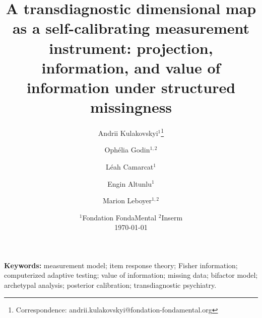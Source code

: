 \documentclass[11pt]{article}
\title{\bfseries A transdiagnostic dimensional map as a self-calibrating
measurement instrument: projection, information, and value of information
under structured missingness}
\author{%
  Andrii Kulakovskyi$^{1}$\thanks{Correspondence: andrii.kulakovskyi@fondation-fondamental.org}\and
  Ophélia Godin$^{1,2}$\and
  Léah Camarcat$^{1}$\and
  Engin Altunlu$^{1}$\and
  Marion Leboyer$^{1,2}$
}
\date{%
  $^{1}$Fondation FondaMental \quad
  $^{2}$Inserm\\[4pt]
  \today
}
\begin{document}
\maketitle

\begin{abstract}
\noindent

\end{abstract}

\noindent\textbf{Keywords:} measurement model; item response theory; Fisher
information; computerized adaptive testing; value of information; missing data;
bifactor model; archetypal analysis; posterior calibration; transdiagnostic
psychiatry.









\end{document}
